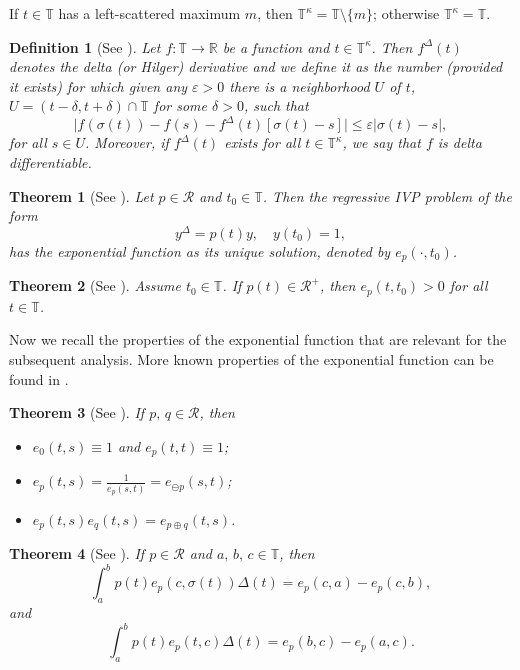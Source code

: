 \documentclass[pdflatex,sn-mathphys-num]{sn-jnl}
\newtheorem{definition}{Definition}
\newtheorem{theorem}{Theorem}
\theoremstyle{remark}
\begin{document}
If $t \in \mathbb{T}$ has a left-scattered maximum $m$, then 
$\mathbb{T}^\kappa = \mathbb{T} \setminus \{m\}$; otherwise 
$\mathbb{T}^\kappa = \mathbb{T}$.

\begin{definition}[See \cite{book:ts}]
\label{delta:derv}
Let $f: \mathbb{T} \rightarrow \mathbb{R}$ be a function and 
$t \in \mathbb{T}^\kappa$. Then $f^\Delta(t)$ denotes the delta (or Hilger) 
derivative and we define it as the number (provided it exists) for which given 
any $\varepsilon > 0$ there is a neighborhood $U$ of $t$, 
$U = (t - \delta, t + \delta) \cap \mathbb{T}$ for some $\delta > 0$, such that 
$$\lvert f(\sigma(t)) - f(s) - f^\Delta(t)[\sigma(t) - s]\rvert 
\leq \varepsilon \lvert \sigma(t) - s \rvert,$$
for all $s \in U$. Moreover, if $f^\Delta(t)$ exists for all 
$t \in \mathbb{T}^\kappa$, we say that $f$ is delta differentiable. 
\end{definition}

\begin{theorem}[See \cite{book:ts}]
\label{thm:1}
Let $p \in \mathcal{R}$ and $t_0 \in \mathbb{T}$. Then the regressive IVP problem 
of the form
$$y^\Delta = p(t)y,\quad y(t_0) = 1,$$
has the exponential function as its unique solution, denoted by $e_p(\cdot, t_0)$. 
\end{theorem}

\begin{theorem}[See \cite{book:ts}]
\label{thm:2}
Assume $t_0 \in \mathbb{T}$. If $p(t) \in \mathcal{R}^+$, then $e_p(t,t_0) > 0$ 
for all $t \in \mathbb{T}$.
\end{theorem}

Now we recall the properties of the exponential function that are relevant
for the subsequent analysis. More known properties of the exponential function 
can be found in \cite{book:ts}.

\begin{theorem}[See \cite{book:ts}]
\label{thm:3}
If $p,\,q \in \mathcal{R}$, then
\begin{itemize}
\item $e_0(t,s) \equiv 1$ and $e_p(t,t) \equiv 1$;
\item $e_p(t,s) = \frac{1}{e_p(s,t)} = e_{\ominus p}(s,t)$;
\item $e_p(t,s)e_q(t,s) = e_{p \oplus q}(t,s)$.
\end{itemize}
\end{theorem}

\begin{theorem}[See \cite{book:ts}]
\label{thm:4}
If $p \in \mathcal{R}$ and $a,\,b,\,c \in \mathbb{T}$, then 
$$\int_{a}^{b} p(t)e_p(c,\sigma(t))\Delta(t) = e_p(c,a) - e_p(c,b),$$
and
$$\int_{a}^{b} p(t)e_p(t,c) \Delta(t) = e_p(b,c) - e_p(a,c).$$
\end{theorem}
\end{document}
